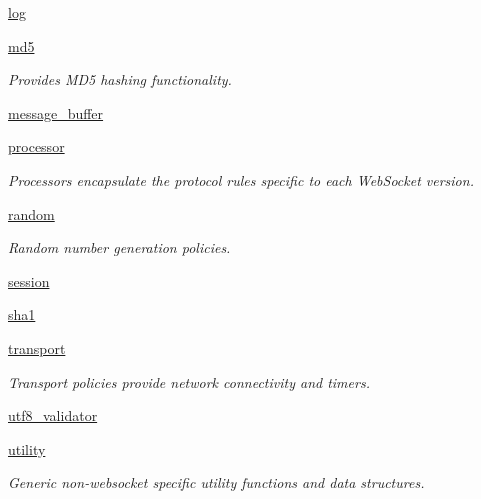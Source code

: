 \begin{DoxyCompactItemize}
\item 
 \hyperlink{namespacewebsocketpp_1_1log}{log}
\item 
 \hyperlink{namespacewebsocketpp_1_1md5}{md5}
\begin{DoxyCompactList}\small\item\em Provides M\+D5 hashing functionality. \end{DoxyCompactList}\item 
 \hyperlink{namespacewebsocketpp_1_1message__buffer}{message\+\_\+buffer}
\item 
 \hyperlink{namespacewebsocketpp_1_1processor}{processor}
\begin{DoxyCompactList}\small\item\em Processors encapsulate the protocol rules specific to each Web\+Socket version. \end{DoxyCompactList}\item 
 \hyperlink{namespacewebsocketpp_1_1random}{random}
\begin{DoxyCompactList}\small\item\em Random number generation policies. \end{DoxyCompactList}\item 
 \hyperlink{namespacewebsocketpp_1_1session}{session}
\item 
 \hyperlink{namespacewebsocketpp_1_1sha1}{sha1}
\item 
 \hyperlink{namespacewebsocketpp_1_1transport}{transport}
\begin{DoxyCompactList}\small\item\em Transport policies provide network connectivity and timers. \end{DoxyCompactList}\item 
 \hyperlink{namespacewebsocketpp_1_1utf8__validator}{utf8\+\_\+validator}
\item 
 \hyperlink{namespacewebsocketpp_1_1utility}{utility}
\begin{DoxyCompactList}\small\item\em Generic non-\/websocket specific utility functions and data structures. \end{DoxyCompactList}\end{DoxyCompactItemize}
